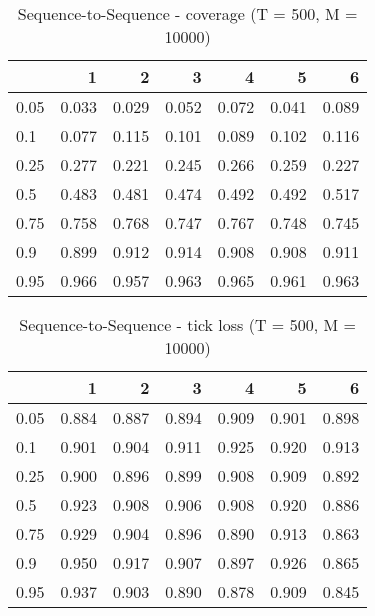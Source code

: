 \documentclass{article}
\begin{document}
\begin{table}[h!]
\centering
\caption{Sequence-to-Sequence - coverage (T = 500, M = 10000)}
\label{tab: Sequence-to-Sequence cov}
\begin{tabular}{lrrrrrr}
\toprule
 & 1 & 2 & 3 & 4 & 5 & 6 \\
\midrule
0.05 & 0.033 & 0.029 & 0.052 & 0.072 & 0.041 & 0.089 \\
0.1 & 0.077 & 0.115 & 0.101 & 0.089 & 0.102 & 0.116 \\
0.25 & 0.277 & 0.221 & 0.245 & 0.266 & 0.259 & 0.227 \\
0.5 & 0.483 & 0.481 & 0.474 & 0.492 & 0.492 & 0.517 \\
0.75 & 0.758 & 0.768 & 0.747 & 0.767 & 0.748 & 0.745 \\
0.9 & 0.899 & 0.912 & 0.914 & 0.908 & 0.908 & 0.911 \\
0.95 & 0.966 & 0.957 & 0.963 & 0.965 & 0.961 & 0.963 \\
\bottomrule
\end{tabular}
\end{table}

\begin{table}[h!]
\centering
\caption{Sequence-to-Sequence - tick loss (T = 500, M = 10000)}
\label{tab: Sequence-to-Sequence tic}
\begin{tabular}{lrrrrrr}
\toprule
 & 1 & 2 & 3 & 4 & 5 & 6 \\
\midrule
0.05 & 0.884 & 0.887 & 0.894 & 0.909 & 0.901 & 0.898 \\
0.1 & 0.901 & 0.904 & 0.911 & 0.925 & 0.920 & 0.913 \\
0.25 & 0.900 & 0.896 & 0.899 & 0.908 & 0.909 & 0.892 \\
0.5 & 0.923 & 0.908 & 0.906 & 0.908 & 0.920 & 0.886 \\
0.75 & 0.929 & 0.904 & 0.896 & 0.890 & 0.913 & 0.863 \\
0.9 & 0.950 & 0.917 & 0.907 & 0.897 & 0.926 & 0.865 \\
0.95 & 0.937 & 0.903 & 0.890 & 0.878 & 0.909 & 0.845 \\
\bottomrule
\end{tabular}
\end{table}
\end{document}
